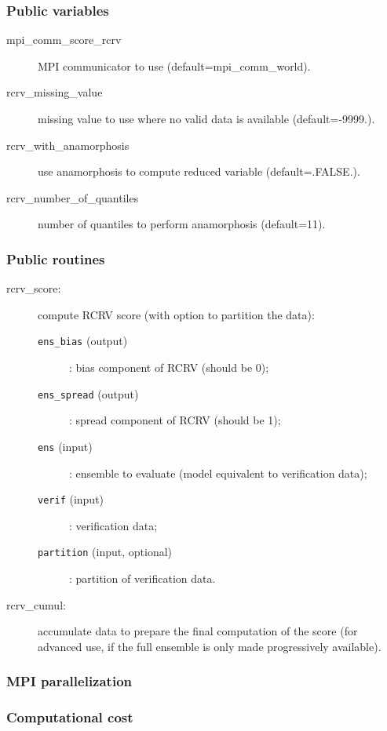 \documentclass[11pt]{article}
\begin{document}
\subsubsection*{Public variables}

\begin{description}
\item[mpi\_comm\_score\_rcrv] MPI communicator to use (default=mpi\_comm\_world).
\item[rcrv\_missing\_value] missing value to use where no valid data is available (default=-9999.).
\item[rcrv\_with\_anamorphosis] use anamorphosis to compute reduced variable (default=.FALSE.).
\item[rcrv\_number\_of\_quantiles] number of quantiles to perform anamorphosis (default=11).
\end{description}

\subsubsection*{Public routines}

\begin{description}
\item[rcrv\_score:] compute RCRV score (with option to partition the data):
  \begin{description}
  \item[{\tt ens\_bias} (output)]: bias component of RCRV (should be 0);
  \item[{\tt ens\_spread} (output)]: spread component of RCRV (should be 1);
  \item[{\tt ens} (input)]: ensemble to evaluate (model equivalent to verification data);
  \item[{\tt verif} (input)]: verification data;
  \item[{\tt partition} (input, optional)]: partition of verification data.
  \end{description}
\item[rcrv\_cumul:] accumulate data to prepare the final computation of the score
                    (for advanced use, if the full ensemble is only made progressively available).
\end{description}

\subsubsection*{MPI parallelization}

\subsubsection*{Computational cost}
\end{document}
